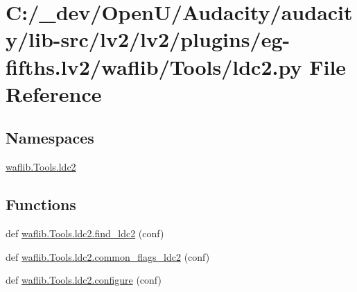 \hypertarget{lv2_2plugins_2eg-fifths_8lv2_2waflib_2_tools_2ldc2_8py}{}\section{C\+:/\+\_\+dev/\+Open\+U/\+Audacity/audacity/lib-\/src/lv2/lv2/plugins/eg-\/fifths.lv2/waflib/\+Tools/ldc2.py File Reference}
\label{lv2_2plugins_2eg-fifths_8lv2_2waflib_2_tools_2ldc2_8py}
\subsection*{Namespaces}
\begin{DoxyCompactItemize}
\item 
 \hyperlink{namespacewaflib_1_1_tools_1_1ldc2}{waflib.\+Tools.\+ldc2}
\end{DoxyCompactItemize}
\subsection*{Functions}
\begin{DoxyCompactItemize}
\item 
def \hyperlink{namespacewaflib_1_1_tools_1_1ldc2_a73aa41d45a6712decaf40b6bc5d35ee5}{waflib.\+Tools.\+ldc2.\+find\+\_\+ldc2} (conf)
\item 
def \hyperlink{namespacewaflib_1_1_tools_1_1ldc2_a183e4e7be481c7c81988655ddc0346d6}{waflib.\+Tools.\+ldc2.\+common\+\_\+flags\+\_\+ldc2} (conf)
\item 
def \hyperlink{namespacewaflib_1_1_tools_1_1ldc2_a930f6047abb96feb45e7391418e486ec}{waflib.\+Tools.\+ldc2.\+configure} (conf)
\end{DoxyCompactItemize}
